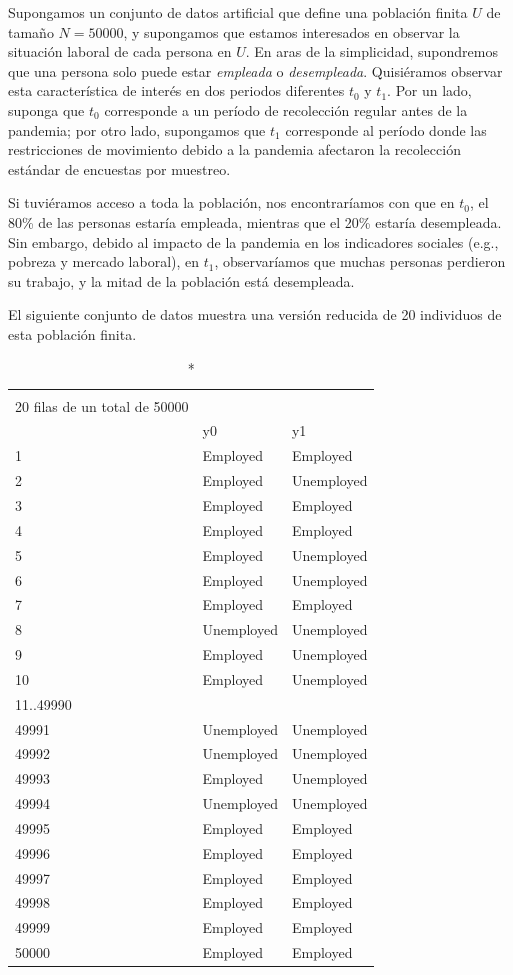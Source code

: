 \documentclass[
  12pt,
]{book}
\begin{document}
Supongamos un conjunto de datos artificial que define una población finita \(U\) de tamaño \(N = 50000\), y supongamos que estamos interesados en observar la situación laboral de cada persona en \(U\). En aras de la simplicidad, supondremos que una persona solo puede estar \emph{empleada} o \emph{desempleada}. Quisiéramos observar esta característica de interés en dos periodos diferentes \(t_0\) y \(t_1\). Por un lado, suponga que \(t_0\) corresponde a un período de recolección regular antes de la pandemia; por otro lado, supongamos que \(t_1\) corresponde al período donde las restricciones de movimiento debido a la pandemia afectaron la recolección estándar de encuestas por muestreo.

Si tuviéramos acceso a toda la población, nos encontraríamos con que en \(t_0\), el 80\% de las personas estaría empleada, mientras que el 20\% estaría desempleada. Sin embargo, debido al impacto de la pandemia en los indicadores sociales (e.g., pobreza y mercado laboral), en \(t_1\), observaríamos que muchas personas perdieron su trabajo, y la mitad de la población está desempleada.

El siguiente conjunto de datos muestra una versión reducida de 20 individuos de esta población finita.

\begin{longtable}{l|ll}
\caption*{
{\large Un vistazo a la población} \\ 
{\small 20 filas de un total de 50000}
} \\ 
\toprule
\multicolumn{1}{l}{} & y0 & y1 \\ 
\midrule
1 & Employed & Employed \\ 
2 & Employed & Unemployed \\ 
3 & Employed & Employed \\ 
4 & Employed & Employed \\ 
5 & Employed & Unemployed \\ 
6 & Employed & Unemployed \\ 
7 & Employed & Employed \\ 
8 & Unemployed & Unemployed \\ 
9 & Employed & Unemployed \\ 
10 & Employed & Unemployed \\ 
11..49990 &  &  \\ 
49991 & Unemployed & Unemployed \\ 
49992 & Unemployed & Unemployed \\ 
49993 & Employed & Unemployed \\ 
49994 & Unemployed & Unemployed \\ 
49995 & Employed & Employed \\ 
49996 & Employed & Employed \\ 
49997 & Employed & Employed \\ 
49998 & Employed & Employed \\ 
49999 & Employed & Employed \\ 
50000 & Employed & Employed \\ 
\bottomrule
\end{longtable}
\end{document}
